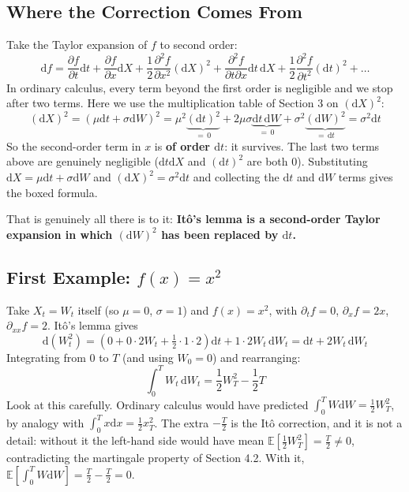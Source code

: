 \documentclass[]{article}
\newcommand{\E}{\mathbb{E}}
\newcommand{\Ito}{It\^{o}}
\newcommand{\dd}{\mathrm{d}}
\begin{document}
	\subsection{Where the Correction Comes From}

	Take the Taylor expansion of $f$ to second order:
	$$
	\dd f = \frac{\partial f}{\partial t} \dd t + \frac{\partial f}{\partial x} \dd X + \frac{1}{2}\frac{\partial^2 f}{\partial x^2} (\dd X)^2 + \frac{\partial^2 f}{\partial t \partial x}\dd t \, \dd X + \frac{1}{2}\frac{\partial^2 f}{\partial t^2}(\dd t)^2 + \dots
	$$
	In ordinary calculus, every term beyond the first order is negligible and we stop after two terms.
	Here we use the multiplication table of Section 3 on $(\dd X)^2$:
	$$
	(\dd X)^2 = \left(\mu \dd t + \sigma \dd W\right)^2 = \mu^2 \underbrace{(\dd t)^2}_{=\,0} + 2\mu\sigma \underbrace{\dd t \, \dd W}_{=\,0} + \sigma^2 \underbrace{(\dd W)^2}_{=\,\dd t} = \sigma^2 \dd t
	$$
	So the second-order term in $x$ is \textbf{of order $\dd t$}: it survives.
	The last two terms above are genuinely negligible ($\dd t \dd X$ and $(\dd t)^2$ are both $0$).
	Substituting $\dd X = \mu \dd t + \sigma \dd W$ and $(\dd X)^2 = \sigma^2 \dd t$ and collecting the $\dd t$ and $\dd W$ terms gives the boxed formula.

	That is genuinely all there is to it: \textbf{\Ito's lemma is a second-order Taylor expansion in which $(\dd W)^2$ has been replaced by $\dd t$.}

	\subsection{First Example: $f(x) = x^2$}

	Take $X_t = W_t$ itself (so $\mu = 0$, $\sigma = 1$) and $f(x) = x^2$, with $\partial_t f = 0$, $\partial_x f = 2x$, $\partial_{xx} f = 2$.
	\Ito's lemma gives
	$$
	\dd (W_t^2) = \left(0 + 0 \cdot 2W_t + \tfrac{1}{2}\cdot 1 \cdot 2\right)\dd t + 1 \cdot 2W_t \, \dd W_t = \dd t + 2 W_t \, \dd W_t
	$$
	Integrating from $0$ to $T$ (and using $W_0 = 0$) and rearranging:
	$$
	\int_0^T W_t \, \dd W_t = \frac{1}{2}W_T^2 - \frac{1}{2}T
	$$
	Look at this carefully. Ordinary calculus would have predicted $\int_0^T W \dd W = \frac12 W_T^2$, by analogy with $\int_0^T x \dd x = \frac12 x_T^2$.
	The extra $-\frac{T}{2}$ is the \Ito{} correction, and it is not a detail: without it the left-hand side would have mean $\E[\frac12 W_T^2] = \frac{T}{2} \neq 0$, contradicting the martingale property of Section 4.2.
	With it, $\E\left[\int_0^T W \dd W\right] = \frac{T}{2} - \frac{T}{2} = 0$. \checkmark
\end{document}
